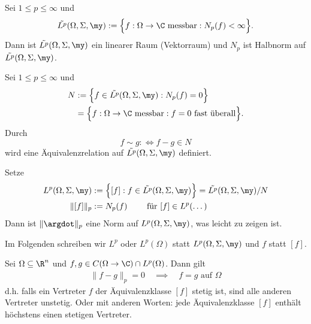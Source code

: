 \begin{df} \label{2.9}
	Sei $1 \le p \le \infty$ und
	\[
		\tilde {L^p} (\Omega, \Sigma, \my)
		:= \Big\{ f : \Omega \to \C \text{ messbar} : N_p(f) < \infty \Big\}.
	\]
	Dann ist $\tilde{L^p}(\Omega, \Sigma, \my)$ ein linearer Raum (Vektorraum) und $N_p$ ist Halbnorm auf $\tilde{L^p}(\Omega, \Sigma, \my)$.
\end{df}

\begin{df} \label{2.10}
	Sei $1 \le p \le \infty$ und
	\begin{align*}
		N &:= \Big\{ f \in \tilde {L^p}(\Omega, \Sigma, \my) : N_p(f) = 0 \Big\} \\
		&= \Big\{ f : \Omega \to \C \text{ messbar} : f = 0 \text{ fast überall} \Big\}.
	\end{align*}
	Durch
	\[
		f \sim g :\iff f-g \in N
	\]
	wird eine Äquivalenzrelation auf $\tilde{L^p}(\Omega, \Sigma, \my)$ definiert.

	Setze
	\begin{align*}
		L^p(\Omega, \Sigma, \my)
		&:= \Big\{ [f] : f \in \tilde{L^p}(\Omega, \Sigma, \my) \Big\}
		= \tilde {L^p} (\Omega, \Sigma, \my) / N \\
		\| [f] \|_p &:= N_p(f) \qquad \text{ für } [f] \in L^p(\dots)
	\end{align*}
	Dann ist $\|\argdot\|_p$ eine Norm auf $L^p(\Omega, \Sigma, \my)$, was leicht zu zeigen ist.

	Im Folgenden schreiben wir $L^p$ oder $L^p(\Omega)$ statt $L^p(\Omega, \Sigma, \my)$ und $f$ statt $[f]$.
\end{df}

\begin{nt} \label{2.11}
	Sei $\Omega \subset \R^n$ und $f,g \in C(\Omega \to \C) \cap L^p(\Omega)$.
	Dann gilt
	\begin{align*}
		\|f - g \|_p = 0
		\quad\implies\quad
		f = g \text{ auf $\Omega$}
	\end{align*}
	d.h. falls ein Vertreter $f$ der Äquivalenzklasse $[f]$ stetig ist, sind alle anderen Vertreter unstetig.
	Oder mit anderen Worten: jede Äquivalenzklasse $[f]$ enthält höchstens einen stetigen Vertreter.
\end{nt}


